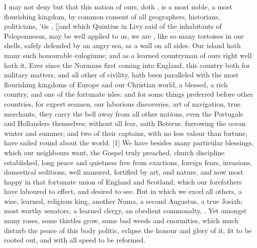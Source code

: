I may not deny but that this nation of ours, doth , is a most noble, a most flourishing kingdom, by common consent
of all geographers, historians, politicians, 'tis ,
[\baselineskip]and which Quintius in Livy said of the inhabitants of
Peloponnesus, may be well applied to us, we are , like so many tortoises in our shells, safely defended by an
angry sea, as a wall on all sides. Our island hath many such honourable
eulogiums; and as a learned countryman of ours right well hath it,
Ever since the Normans first coming into England, this country
both for military matters, and all other of civility, hath been
paralleled with the most flourishing kingdoms of Europe and our
Christian world, a blessed, a rich country, and one of the fortunate
isles: and for some things preferred before other countries, for
expert seamen, our laborious discoveries, art of navigation, true
merchants, they carry the bell away from all other nations, even the
Portugals and Hollanders themselves; without all fear, saith
Boterus, furrowing the ocean winter and summer, and two of their
captains, with no less valour than fortune, have sailed round about the
world. [1\baselineskip] We have besides many particular blessings, which our
neighbours want, the Gospel truly preached, church discipline
established, long peace and quietness free from exactions, foreign
fears, invasions, domestical seditions, well manured, fortified by
art, and nature, and now most happy in that fortunate union of England
and Scotland, which our forefathers have laboured to effect, and
desired to see. But in which we excel all others, a wise, learned,
religious king, another Numa, a second Augustus, a true Josiah; most
worthy senators, a learned clergy, an obedient commonalty, \etc{}. Yet
amongst many roses, some thistles grow, some bad weeds and enormities,
which much disturb the peace of this body politic, eclipse the honour
and glory of it, fit to be rooted out, and with all speed to be
reformed.

